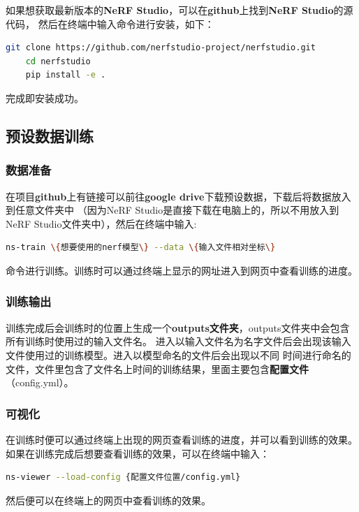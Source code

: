 \documentclass{nwputhesis}
\begin{document}
\indent
如果想获取最新版本的\textbf{NeRF Studio}，可以在\textbf{github}上找到\textbf{NeRF Studio}的源代码，
然后在终端中输入命令进行安装，如下：
\begin{lstlisting}[language=bash]
    git clone https://github.com/nerfstudio-project/nerfstudio.git
    cd nerfstudio
    pip install -e .
\end{lstlisting}

\indent
完成即安装成功。

\subsection{预设数据训练}
\hypertarget{6.3}{}
\subsubsection{数据准备}
在项目\textbf{github}上有链接可以前往\textbf{google drive}下载预设数据，下载后将数据放入到任意文件夹中
（因为NeRF Studio是直接下载在电脑上的，所以不用放入到NeRF Studio文件夹中），然后在终端中输入:
\begin{lstlisting}[language=bash]
    ns-train \{想要使用的nerf模型\} --data \{输入文件相对坐标\}
\end{lstlisting}

\indent
命令进行训练。训练时可以通过终端上显示的网址进入到网页中查看训练的进度。
\subsubsection{训练输出}
训练完成后会训练时的位置上生成一个\textbf{outputs文件夹}，outputs文件夹中会包含所有训练时使用过的输入文件名。
进入以输入文件名为名字文件后会出现该输入文件使用过的训练模型。进入以模型命名的文件后会出现以不同
时间进行命名的文件，文件里包含了文件名上时间的训练结果，里面主要包含\textbf{配置文件}（config.yml）。
\subsubsection{可视化}
在训练时便可以通过终端上出现的网页查看训练的进度，并可以看到训练的效果。如果在训练完成后想要查看训练的效果，可以在终端中输入：
\begin{lstlisting}[language=bash]
    ns-viewer --load-config {配置文件位置/config.yml}
\end{lstlisting}

\indent
然后便可以在终端上的网页中查看训练的效果。
\end{document}
